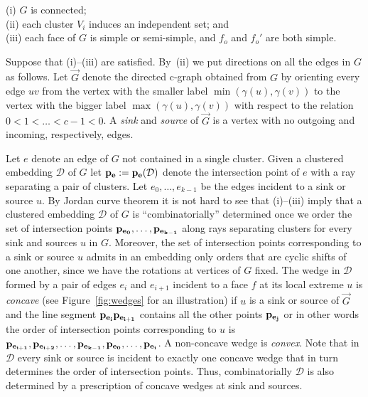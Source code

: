 \documentclass{llncs}
\newif\iflong
\begin{document}
\noindent
(i) $G$ is connected; \\
(ii) each cluster $V_i$ induces an independent set; and \\
(iii) each face of $G$ is simple or semi-simple, and $f_o$ and $f_o'$ are both simple. 

Suppose that (i)--(iii) are satisfied. 
By~(ii) we  put directions on all the edges in $G$ as follows.
Let $\overrightarrow{G}$ denote the directed c-graph obtained from $G$ by orienting every edge
$uv$ from the vertex with the smaller label $\min (\gamma(u), \gamma(v))$ to the vertex with the bigger label $\max (\gamma(u), \gamma(v))$ with respect to the relation $0<1<\ldots < c-1<0$.
A \emph{sink} and \emph{source} of $\overrightarrow{G}$ is
a vertex with no outgoing and incoming, respectively, edges.


Let $e$ denote an edge of $G$ not contained in a single 
cluster.
Given a clustered embedding $\mathcal{D}$ of $G$ let ${\bf p_{e}}:={\bf p_{e}}(\mathcal{D})$ denote the intersection point of $e$ with a ray separating a pair of clusters.
Let $e_0,\ldots,e_{k-1}$ be  the  edges
 incident to a sink or source $u$.
By Jordan curve theorem it is not hard to see that (i)--(iii) imply that a clustered embedding $\mathcal{D}$ of $G$ is ``combinatorially'' determined once we order the set 
  of intersection points
 ${\bf p_{e_0}}, \ldots , {\bf p_{e_{k-1}}}$ along
 rays separating clusters for every sink and sources $u$ in $G$. Moreover, the set of intersection points corresponding to a sink or source $u$ admits in
 an embedding only orders that are cyclic shifts of
 one another, since we have the rotations at vertices 
 of $G$ fixed.
 The wedge in $\mathcal{D}$ formed by a pair of edges $e_i$ and $e_{i+1}$ incident to a face $f$ at its local extreme $u$ is \emph{concave} (see Figure~\ref{fig:wedges} 
 for an illustration) if 
$u$ is a sink or source of $\overrightarrow{G}$ and
the line segment ${\bf p_{e_i}}{\bf p_{e_{i+1}}}$ contains all the other points ${\bf p_{e_j}}$ or
in other words the order of intersection points
corresponding to $u$ is ${\bf p_{e_{i+1}},p_{e_{i+2}}, \ldots, p_{e_{k-1}},p_{e_{0}}, \ldots , p_{e_i}}$.
A non-concave wedge is \emph{convex}.\iflong\footnote{The terminology comes from the fact that in an embedding that is ``combinatorially the same'' with straight line edges, wedges become convex and concave in the usual sense.}\fi
Note that in $\mathcal{D}$ every sink or source is
incident to exactly one concave wedge that in
turn determines the order of intersection points.
Thus, combinatorially $\mathcal{D}$ is also determined
by a prescription of concave wedges at sink and sources.
\end{document}
